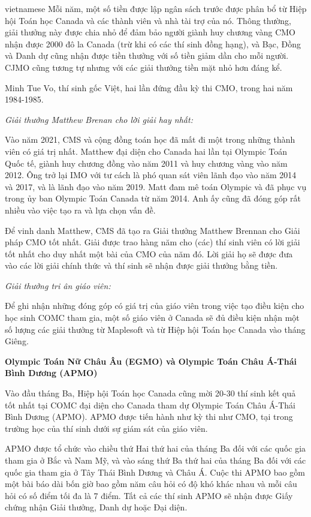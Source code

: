 \documentclass{article}
\begin{document}
\begin{otherlanguage*}{vietnamese}
Mỗi năm, một số tiền được lập ngân sách trước được phân bổ từ Hiệp hội Toán học Canada và các thành viên và nhà tài trợ của nó.
Thông thường, giải thưởng này được chia nhỏ để đảm bảo người giành huy chương vàng CMO nhận được 2000 đô la Canada (trừ khi có các thí sinh đồng hạng),
và Bạc, Đồng và Danh dự cũng nhận được tiền thưởng với số tiền giảm dần cho mỗi người. CJMO cũng tương tự nhưng với các giải thưởng tiền mặt nhỏ hơn đáng kể.

\begin{remark*}
    Minh Tue Vo, thí sinh gốc Việt, hai lần đứng đầu kỳ thi CMO, trong hai năm 1984-1985.
\end{remark*}

\textit{Giải thưởng Matthew Brenan cho lời giải hay nhất:}

Vào năm 2021, CMS và cộng đồng toán học đã mất đi một trong những thành viên có giá trị nhất.
Matthew đại diện cho Canada hai lần tại Olympic Toán Quốc tế, giành huy chương đồng vào năm 2011 và huy chương vàng vào năm 2012.
Ông trở lại IMO với tư cách là phó quan sát viên lãnh đạo vào năm 2014 và 2017, và là lãnh đạo vào năm 2019.
Matt đam mê toán Olympic và đã phục vụ trong ủy ban Olympic Toán Canada từ năm 2014.
Anh ấy cũng đã đóng góp rất nhiều vào việc tạo ra và lựa chọn vấn đề.

Để vinh danh Matthew, CMS đã tạo ra Giải thưởng Matthew Brennan cho Giải pháp CMO tốt nhất.
Giải được trao hàng năm cho (các) thí sinh viên có lời giải tốt nhất cho duy nhất một bài của CMO của năm đó.
Lời giải họ sẽ được đưa vào các lời giải chính thức và thí sinh sẽ nhận được giải thưởng bằng tiền.

\textit{Giải thưởng tri ân giáo viên:}

Để ghi nhận những đóng góp có giá trị của giáo viên trong việc tạo điều kiện cho học sinh COMC tham gia,
một số giáo viên ở Canada sẽ đủ điều kiện nhận một số lượng các giải thưởng từ Maplesoft và từ Hiệp hội Toán học Canada vào tháng Giêng.

\bigbreak
\textbf{Olympic Toán Nữ Châu Âu (EGMO) và Olympic Toán Châu Á-Thái Bình Dương (APMO)}

Vào đầu tháng Ba, Hiệp hội Toán học Canada cũng mời 20-30 thí sinh kết quả tốt nhất tại COMC đại diện cho Canada tham dự Olympic Toán Châu Á-Thái Bình Dương (APMO).
APMO được tiến hành như kỳ thi như CMO, tại trong trường học của thí sinh dưới sự giám sát của giáo viên.

APMO được tổ chức vào chiều thứ Hai thứ hai của tháng Ba đối với các quốc gia tham gia ở Bắc và Nam Mỹ, và vào sáng thứ Ba thứ hai của tháng Ba đối với các quốc gia tham gia ở Tây Thái Bình Dương và Châu Á.
Cuộc thi APMO bao gồm một bài báo dài bốn giờ bao gồm năm câu hỏi có độ khó khác nhau và mỗi câu hỏi có số điểm tối đa là 7 điểm.
Tất cả các thí sinh APMO sẽ nhận được Giấy chứng nhận Giải thưởng, Danh dự hoặc Đại diện.


\end{otherlanguage*}
\end{document}
